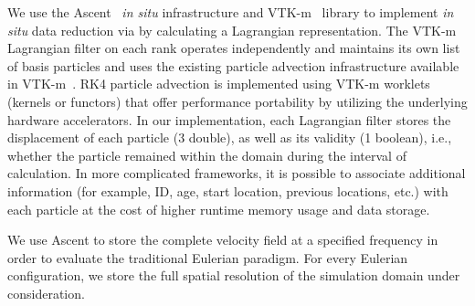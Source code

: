 We use the Ascent~\cite{larsen2017alpine} \textit{in situ} infrastructure and VTK-m~\cite{moreland2016vtk} library to implement \textit{in situ} data reduction via by calculating a Lagrangian representation. 
%
%
%
%
%
%
%
The VTK-m Lagrangian filter on each rank operates independently and maintains its own list of basis particles and uses the existing particle advection infrastructure available in VTK-m~\cite{pugmire2018performance}.
%
RK4 particle advection is implemented using VTK-m worklets (kernels or functors) that offer performance portability by utilizing the underlying hardware accelerators. 
%
%
In our implementation, each Lagrangian filter stores the displacement of each particle (3 double), as well as its validity (1 boolean), i.e., whether the particle remained within the domain during the interval of calculation.
%
%
%
In more complicated frameworks, it is possible to associate additional information (for example, ID, age, start location, previous locations, etc.) with each particle at the cost of higher runtime memory usage and data storage.
%
%

We use Ascent to store the complete velocity field at a specified frequency in order to evaluate the traditional Eulerian paradigm.
%
%
For every Eulerian configuration, we store the full spatial resolution of the simulation domain under consideration. 
%
